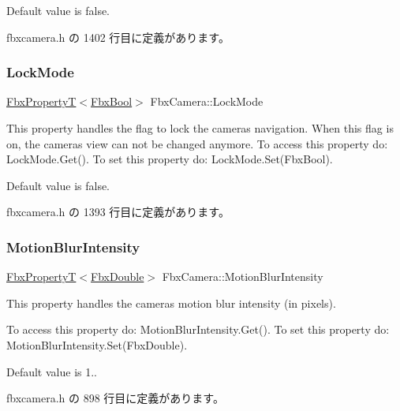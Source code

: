 Default value is false. 

 fbxcamera.\+h の 1402 行目に定義があります。

\mbox{\label{class_fbx_camera_aba8fcdabc543461794dcfbd683af1e76}} 
\subsubsection{\texorpdfstring{Lock\+Mode}{LockMode}}
{\footnotesize\ttfamily \hyperlink{class_fbx_property_t}{Fbx\+PropertyT}$<$\hyperlink{fbxtypes_8h_a92e0562b2fe33e76a242f498b362262e}{Fbx\+Bool}$>$ Fbx\+Camera\+::\+Lock\+Mode}

This property handles the flag to lock the camera\textquotesingle{}s navigation. When this flag is on, the camera\textquotesingle{}s view can not be changed anymore. To access this property do\+: Lock\+Mode.\+Get(). To set this property do\+: Lock\+Mode.\+Set(\+Fbx\+Bool).

Default value is false. 

 fbxcamera.\+h の 1393 行目に定義があります。

\mbox{\label{class_fbx_camera_aef324a28772e42e910b983642b635769}} 
\subsubsection{\texorpdfstring{Motion\+Blur\+Intensity}{MotionBlurIntensity}}
{\footnotesize\ttfamily \hyperlink{class_fbx_property_t}{Fbx\+PropertyT}$<$\hyperlink{fbxtypes_8h_a171e72a1c46fc15c1a6c9c31948c1c5b}{Fbx\+Double}$>$ Fbx\+Camera\+::\+Motion\+Blur\+Intensity}

This property handles the camera\textquotesingle{}s motion blur intensity (in pixels).

To access this property do\+: Motion\+Blur\+Intensity.\+Get(). To set this property do\+: Motion\+Blur\+Intensity.\+Set(\+Fbx\+Double).

Default value is 1.. 

 fbxcamera.\+h の 898 行目に定義があります。

\mbox{\label{class_fbx_camera_adbca6c29099ceac39fb350201fb3163d}} 
